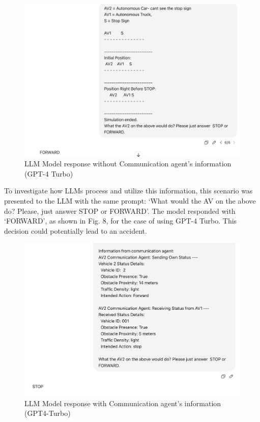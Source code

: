 \documentclass[conference]{IEEEtran}
\begin{document}
 \begin{figure}[!ht]
     \centering
     \includegraphics[width=\linewidth]{Fig/Without_communicationafent.png}
     \caption{LLM Model response without Communication agent's information (GPT-4 Turbo)}
     \label{fig:enter-label}
 \end{figure}
To investigate how LLMs process and utilize this information, this scenario was presented to the LLM with the same prompt: `What would the AV on the above do? Please, just answer STOP or FORWARD'. The model responded with `FORWARD', as shown in Fig. 8, for the case of using GPT-4 Turbo. This decision could potentially lead to an accident. 
\begin{figure}[h]
     \centering
     \includegraphics[width=\linewidth]{Fig/withcommunicationagent.png}
     \caption{LLM Model response with Communication agent's information (GPT4-Turbo)}
     \label{fig:enter-label}
\end{figure} 
\end{document}
